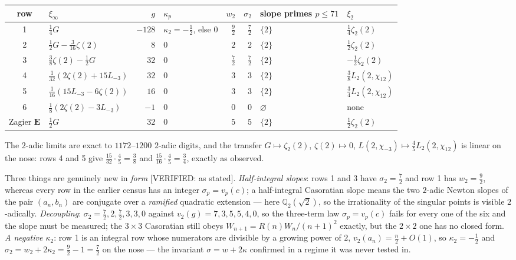 \documentclass[11pt,reqno]{amsart}
\theoremstyle{plain}
\theoremstyle{definition}
\theoremstyle{remark}
\theoremstyle{plain}
\newcommand{\Q}{\mathbb{Q}}
\newcommand{\Verified}[1]{\textup{\textsf{[VERIFIED: #1]}}}
\begin{document}
\begin{center}\footnotesize
\begin{tabular}{clrlrrll}
\toprule
row & $\xi_\infty$ & $g$ & $\kappa_p$ & $w_2$ & $\sigma_2$ & slope primes $p\le71$ & $\xi_2$\\
\midrule
1 & $\tfrac14G$ & $-128$ & $\kappa_2=-\tfrac12$, else $0$ & $\tfrac92$ & $\tfrac72$ & $\{2\}$ & $\tfrac14\zeta_2(2)$\\
2 & $\tfrac12G-\tfrac3{16}\zeta(2)$ & $8$ & $0$ & $2$ & $2$ & $\{2\}$ & $\tfrac12\zeta_2(2)$\\
3 & $\tfrac38\zeta(2)-\tfrac12G$ & $32$ & $0$ & $\tfrac72$ & $\tfrac72$ & $\{2\}$ & $-\tfrac12\zeta_2(2)$\\
4 & $\tfrac1{32}(2\zeta(2)+15L_{-3})$ & $32$ & $0$ & $3$ & $3$ & $\{2\}$ & $\tfrac38L_2(2,\chi_{12})$\\
5 & $\tfrac1{16}(15L_{-3}-6\zeta(2))$ & $16$ & $0$ & $3$ & $3$ & $\{2\}$ & $\tfrac34L_2(2,\chi_{12})$\\
6 & $\tfrac18(2\zeta(2)-3L_{-3})$ & $-1$ & $0$ & $0$ & $0$ & $\varnothing$ & none\\
Zagier $\mathbf E$ & $\tfrac12G$ & $32$ & $0$ & $5$ & $5$ & $\{2\}$ & $\tfrac12\zeta_2(2)$\\
\bottomrule
\end{tabular}
\end{center}

The $2$-adic limits are exact to $1172$--$1200$ $2$-adic digits, and the transfer
$G\mapsto\zeta_2(2)$, $\zeta(2)\mapsto0$, $L(2,\chi_{-3})\mapsto\tfrac45L_2(2,\chi_{12})$
is linear on the nose: rows 4 and 5 give $\tfrac{15}{32}\cdot\tfrac45=\tfrac38$
and $\tfrac{15}{16}\cdot\tfrac45=\tfrac34$, exactly as observed.

Three things are genuinely new in \emph{form} \Verified{as stated}.
\emph{Half-integral slopes}: rows 1 and 3 have $\sigma_2=\tfrac72$ and row 1 has
$w_2=\tfrac92$, whereas every row in the earlier census has an integer
$\sigma_p=v_p(c)$; a half-integral Casoratian slope means the two $2$-adic Newton
slopes of the pair $(a_n,b_n)$ are conjugate over a \emph{ramified} quadratic
extension --- here $\Q_2(\sqrt2)$, so the irrationality of the singular points is
visible $2$-adically. \emph{Decoupling}: $\sigma_2=\tfrac72,2,\tfrac72,3,3,0$
against $v_2(g)=7,3,5,5,4,0$, so the three-term law $\sigma_p=v_p(c)$ fails for
every one of the six and the slope must be measured; the $3\times3$ Casoratian
still obeys $W_{n+1}=R(n)W_n/(n+1)^2$ exactly, but the $2\times2$ one has no
closed form. \emph{A negative $\kappa_2$}: row 1 is an integral row whose
numerators are divisible by a growing power of $2$, $v_2(a_n)=\tfrac n2+O(1)$, so
$\kappa_2=-\tfrac12$ and $\sigma_2=w_2+2\kappa_2=\tfrac92-1=\tfrac72$ on the
nose --- the invariant $\sigma=w+2\kappa$ confirmed in a regime it was never
tested in.
\end{document}
